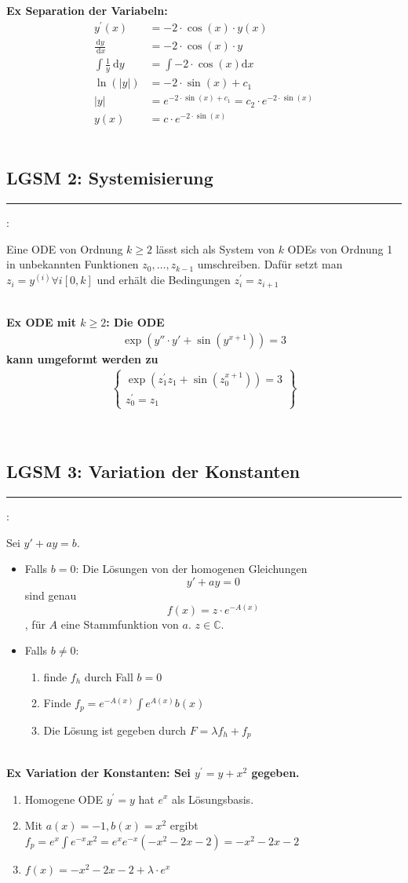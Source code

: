 \documentclass[7pt,landscape, margin = 0.1mm]{article}
\newcommand*{\mysubsection}[1]{\vspace{-2mm}\color{chaptercolor}\subsection{ #1 }
\vspace{-1mm}\hrule\vspace{1.5mm}\color{black}
\vspace{2mm}}
\newcommand{\KRZ}[2]{\vspace{1mm} \hline \vspace{1mm} \color{chaptercolor}{RC #1}:\color{black} \   \hspace{0.2cm}\vspace{1mm}   {\begin{minipage}{20em}
#2 \end{minipage}} \vspace{1mm}  \hline \vspace{1mm}  \\}
\newcommand{\EX}[2]{\color{chaptercolor}\bf{Ex #1}:\color{black}    \hspace{0.2cm} #2 \\}
\begin{document}
\begin{multicols}{4}
\begin{flushleft}
\EX{Separation der Variabeln}{\begin{align*}
y^{\prime}(x) & =-2 \cdot \cos (x) \cdot y(x) \\
\frac{\mathrm{d} y}{\mathrm{~d} x} & =-2 \cdot \cos (x) \cdot y \\
\int \frac{1}{y} \mathrm{~d} y & =\int-2 \cdot \cos (x) \mathrm{d} x \\
\ln (|y|) & =-2 \cdot \sin (x)+c_1 \\
|y| & =e^{-2 \cdot \sin (x)+c_1}=c_2 \cdot e^{-2 \cdot \sin (x)} \\
y(x) & =c \cdot e^{-2 \cdot \sin (x)}
\end{align*}}
\mysubsection{LGSM 2: Systemisierung}
\KRZ{ODE mit $k \geq 2$}{Eine ODE von Ordnung $k \geq 2$ lässt sich als System von $k$ ODEs von Ordnung 1 in unbekannten Funktionen $z_0,\ldots,z_{k-1}$ umschreiben. Dafür setzt man $z_{i}=y^{(i)} \forall i [0,k]$ und erhält die Bedingungen $z_{i}^{\prime}=z_{i+1}$}

\EX{ODE mit $k \geq 2$}{Die ODE \begin{align*}
\exp(y''\cdot y'+\sin(y^{x+1})) =3
\end{align*} kann umgeformt werden zu \begin{align*}
\left\{\begin{array}{l}
\exp \left(z_1^{\prime} z_1+\sin \left(z_0^{x+1}\right)\right)=3 \\
z_0^{\prime}=z_1
\end{array}\right\}
\end{align*}

}
\mysubsection{LGSM 3: Variation der Konstanten}


\KRZ{Variation der Konstanten}{
Sei $y'+ay=b$.
\begin{itemize}
\item Falls $b=0$:
Die Lösungen von der homogenen Gleichungen $$y' +ay=0$$ sind genau $$f(x)=z\cdot e^{-A(x)}$$, für $A$ eine Stammfunktion von $a$. $z\in \mathbb{C}$.

\item Falls $b\neq0$:
\begin{enumerate}
\item finde $f_{h}$ durch Fall $b=0$
\item Finde $f_{p} =e^{-A(x)}\int e^{A(x)}b(x)$
\item Die Lösung ist gegeben durch $F = \lambda f_h +f_{p}$
\end{enumerate}
\end{itemize}

}
\EX{Variation der Konstanten}{
Sei $y^{\prime}=y+x^2$ gegeben. 
\begin{enumerate}
\item Homogene ODE $y^{\prime}=y$ hat $e^x$ als Lösungsbasis.
\item Mit $a(x)=-1, b(x)=x^2$ ergibt $f_p = e^{x}\int e^{-x}x^2 =e^{x}e^{-x}\left(-x^2-2 x-2\right)=-x^2-2 x-2$
\item $f(x)=-x^2-2 x-2+\lambda \cdot e^x$ 
\end{enumerate}


}
\end{flushleft}
\end{multicols}
\end{document}
